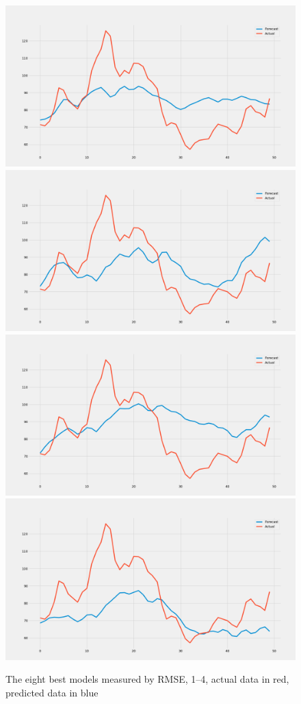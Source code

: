 \begin{figure}[H]
    \includegraphics[width=.48\textwidth]{../data/Figures/Neural networks/ForLoop_Tensor/plotModel_186.png}\hfill
    \includegraphics[width=.48\textwidth]{../data/Figures/Neural networks/ForLoop_Tensor/plotModel_72.png}\hfill
    \\[\smallskipamount]
    \includegraphics[width=.48\textwidth]{../data/Figures/Neural networks/ForLoop_Tensor/plotmodel_286.png}\hfill
    \includegraphics[width=.48\textwidth]{../data/Figures/Neural networks/ForLoop_Tensor/plotmodel_46.png}
    \captionsetup{justification=centering}
    \caption[The eight best models measured by RMSE, 1--4]{The eight best models measured by RMSE, 1--4, actual data in red, predicted data in blue}\label{fig:best_models14}
\end{figure}

